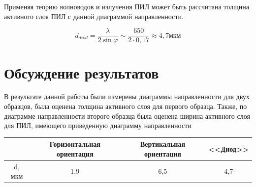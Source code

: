 \documentclass[a4paper,12pt]{article}
\begin{document}
Применяя теорию волноводов и излучения ПИЛ может быть рассчитана толщина активного слоя ПИЛ с данной диаграммой направленности.

$$
	d_{diod} = \frac{\lambda}{2 \sin \varphi} \sim \frac{650}{2 \cdot 0,17 } \approx 4,7 \text{мкм}
$$

\newpage

\section{Обсуждение результатов}

В результате данной работы были измерены диаграммы направленности для двух образцов, была оценена толщина активного слоя для первого образца. Также, по диаграмме направленности второго образца была оценена ширина активного слоя для ПИЛ, имеющего приведенную диаграмму направленности

\begin{table}[h!]	
	\centering
	\begin{tabular}{|c|c|c|c|}
	\hline
	       & Горизонтальная ориентация & Вертикальная ориентация & <<Диод>>\\ \hline
	d, мкм & 1,9                       & 6,5                     &   4,7\\ \hline
	\end{tabular}
\end{table}                             
\end{document}
